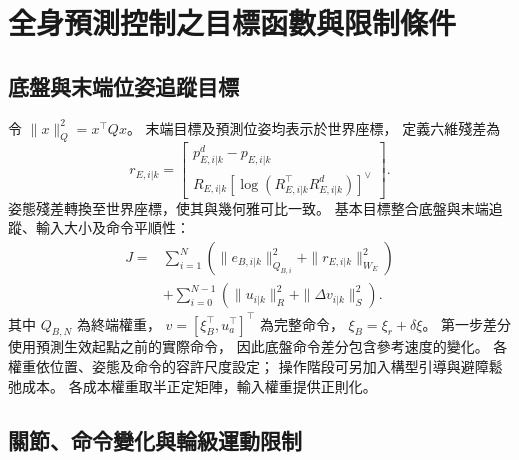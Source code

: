 \section{全身預測控制之目標函數與限制條件}
\label{sec:wholebody_objective_constraints}

\subsection{底盤與末端位姿追蹤目標}
\label{subsec:wholebody_tracking_objective}

令 $\|x\|_Q^2=x^\top Qx$。
末端目標及預測位姿均表示於世界座標，
定義六維殘差為
\begin{equation}
    r_{E,i|k}=
    \begin{bmatrix}
        p_{E,i|k}^{d}-p_{E,i|k}\\
        R_{E,i|k}
        [\log(R_{E,i|k}^{\top}R_{E,i|k}^{d})]^\vee
    \end{bmatrix}.
    \label{eq:ch3_tcp_pose_residual}
\end{equation}
姿態殘差轉換至世界座標，使其與幾何雅可比一致。
基本目標整合底盤與末端追蹤、輸入大小及命令平順性：
\begin{equation}
    \begin{aligned}
        J={}&\sum_{i=1}^{N}
        \left(\|e_{B,i|k}\|_{Q_{B,i}}^2+
              \|r_{E,i|k}\|_{W_E}^2\right)\\
        &+\sum_{i=0}^{N-1}
        \left(\|u_{i|k}\|_R^2+
              \|\Delta v_{i|k}\|_S^2\right).
    \end{aligned}
    \label{eq:ch3_wholebody_objective}
\end{equation}
其中 $Q_{B,N}$ 為終端權重，
$v=[\xi_B^\top,u_a^\top]^\top$ 為完整命令，
$\xi_B=\xi_r+\delta\xi$。
第一步差分使用預測生效起點之前的實際命令，
因此底盤命令差分包含參考速度的變化。
各權重依位置、姿態及命令的容許尺度設定；
操作階段可另加入構型引導與避障鬆弛成本。
各成本權重取半正定矩陣，輸入權重提供正則化。

\subsection{關節、命令變化與輪級運動限制}
\label{subsec:joint_command_wheel_constraints}

